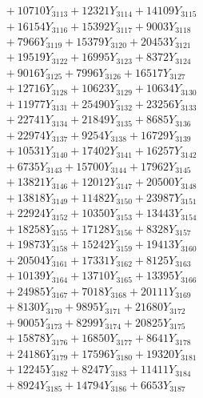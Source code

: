 \documentclass[a4paper,10pt]{article}
\begin{document}
{\begin{align}
&\;  + 10710 Y_{3113} + 12321 Y_{3114} + 14109 Y_{3115} \\[0.3ex]
&\;  + 16154 Y_{3116} + 15392 Y_{3117} + 9003 Y_{3118} \\[0.5ex]\allowbreak
&\;  + 7966 Y_{3119} + 15379 Y_{3120} + 20453 Y_{3121} \\[0.3ex]
&\;  + 19519 Y_{3122} + 16995 Y_{3123} + 8372 Y_{3124} \\[0.3ex]
&\;  + 9016 Y_{3125} + 7996 Y_{3126} + 16517 Y_{3127} \\[0.3ex]
&\;  + 12716 Y_{3128} + 10623 Y_{3129} + 10634 Y_{3130} \\[0.3ex]
&\;  + 11977 Y_{3131} + 25490 Y_{3132} + 23256 Y_{3133} \\[0.3ex]
&\;  + 22741 Y_{3134} + 21849 Y_{3135} + 8685 Y_{3136} \\[0.3ex]
&\;  + 22974 Y_{3137} + 9254 Y_{3138} + 16729 Y_{3139} \\[0.3ex]
&\;  + 10531 Y_{3140} + 17402 Y_{3141} + 16257 Y_{3142} \\[0.3ex]
&\;  + 6735 Y_{3143} + 15700 Y_{3144} + 17962 Y_{3145} \\[0.3ex]
&\;  + 13821 Y_{3146} + 12012 Y_{3147} + 20500 Y_{3148} \\[0.5ex]\allowbreak
&\;  + 13818 Y_{3149} + 11482 Y_{3150} + 23987 Y_{3151} \\[0.3ex]
&\;  + 22924 Y_{3152} + 10350 Y_{3153} + 13443 Y_{3154} \\[0.3ex]
&\;  + 18258 Y_{3155} + 17128 Y_{3156} + 8328 Y_{3157} \\[0.3ex]
&\;  + 19873 Y_{3158} + 15242 Y_{3159} + 19413 Y_{3160} \\[0.3ex]
&\;  + 20504 Y_{3161} + 17331 Y_{3162} + 8125 Y_{3163} \\[0.3ex]
&\;  + 10139 Y_{3164} + 13710 Y_{3165} + 13395 Y_{3166} \\[0.3ex]
&\;  + 24985 Y_{3167} + 7018 Y_{3168} + 20111 Y_{3169} \\[0.3ex]
&\;  + 8130 Y_{3170} + 9895 Y_{3171} + 21680 Y_{3172} \\[0.3ex]
&\;  + 9005 Y_{3173} + 8299 Y_{3174} + 20825 Y_{3175} \\[0.3ex]
&\;  + 15878 Y_{3176} + 16850 Y_{3177} + 8641 Y_{3178} \\[0.5ex]\allowbreak
&\;  + 24186 Y_{3179} + 17596 Y_{3180} + 19320 Y_{3181} \\[0.3ex]
&\;  + 12245 Y_{3182} + 8247 Y_{3183} + 11411 Y_{3184} \\[0.3ex]
&\;  + 8924 Y_{3185} + 14794 Y_{3186} + 6653 Y_{3187} \\[0.3ex]

\end{align}}
\end{document}
